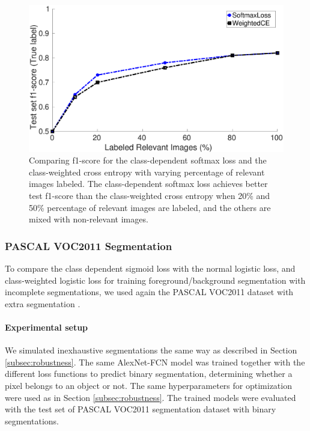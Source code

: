 \begin{figure}[t]
\centering
   \includegraphics[width=1.05\linewidth]{img/pu_vs_pn}
\caption{
Comparing f1-score for the class-dependent softmax loss and the class-weighted cross entropy with varying percentage of relevant images labeled.
The class-dependent softmax loss achieves better test f1-score than the class-weighted cross entropy when 20\% and 50\% percentage of relevant images are labeled, and the others are mixed with non-relevant images.
}
\label{fig:pct_annotating}
\end{figure}


\subsubsection{PASCAL VOC2011 Segmentation}
To compare the class dependent sigmoid loss with the normal logistic loss, and class-weighted logistic loss for training foreground/background segmentation with incomplete segmentations, we used again the PASCAL VOC2011 dataset with extra segmentation \cite{hariharan2011semantic}.

\paragraph{Experimental setup}
We simulated inexhaustive segmentations the same way as described in Section \ref{subsec:robustness}.
The same AlexNet-FCN model was trained together with the different loss functions to predict binary segmentation, determining whether a pixel belongs to an object or not.
The same hyperparameters for optimization were used as in Section \ref{subsec:robustness}.
The trained models were evaluated with the test set of PASCAL VOC2011 segmentation dataset with binary segmentations.


